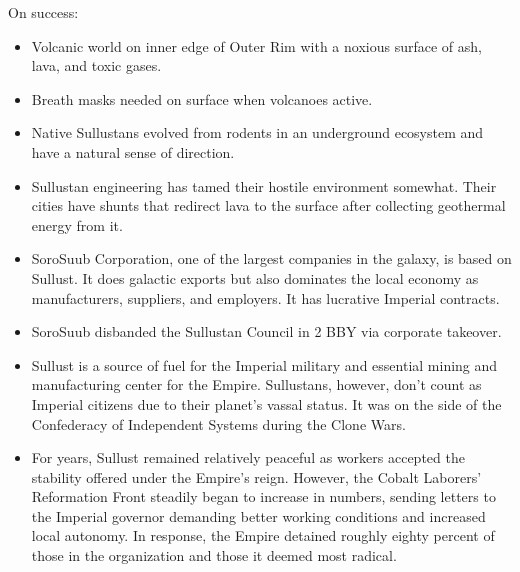 \documentclass{book}
\begin{document}
\begin{multicols}{2}
On success:
\begin{itemize}
    \item Volcanic world on inner edge of Outer Rim with a noxious surface of ash, lava, and toxic gases.  
    \item Breath masks needed on surface when volcanoes active.
    \item Native Sullustans evolved from rodents in an underground ecosystem and have a natural sense of direction.
    \item \advantage  Sullustan engineering has tamed their hostile environment somewhat. Their cities have shunts that redirect lava to the surface after collecting geothermal energy from it.
   \item \advantage SoroSuub Corporation, one of the largest companies in the galaxy, is based on Sullust. It does galactic exports but also dominates the local economy as manufacturers, suppliers, and employers.  It has lucrative Imperial contracts.%
	\item \advantage SoroSuub disbanded the Sullustan Council in 2 BBY via corporate takeover.
    \item \advantage Sullust is a source of fuel for the Imperial military and essential mining and manufacturing center for the Empire.  Sullustans, however, don't count as Imperial citizens due to their planet's vassal status.  It was on the side of the Confederacy of Independent Systems during the Clone Wars.
    \item \advantage For years, Sullust remained relatively peaceful as workers accepted the stability offered under the Empire's reign. However, the Cobalt Laborers' Reformation Front steadily began to increase in numbers, sending letters to the Imperial governor demanding better working conditions and increased local autonomy. In response, the Empire detained roughly eighty percent of those in the organization and those it deemed most radical.

\end{itemize}
\end{multicols}
\end{document}

